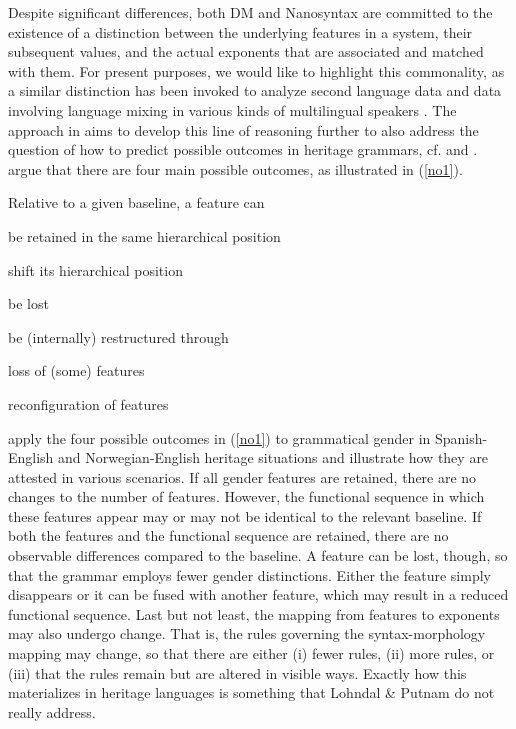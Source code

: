 \documentclass[output=paper,colorlinks,citecolor=brown,footheight=42pt]{langscibook}
\begin{document}
Despite significant differences, both DM and Nanosyntax are committed to the existence of a distinction between the underlying features in a system, their subsequent values, and the actual exponents that are associated and matched with them. For present purposes, we would like to highlight this commonality, as a similar distinction has been invoked to analyze second language data and data involving language mixing in various kinds of multilingual speakers \citep{lardiere1998, lardiere2008, prevost2000,alexiadou2017,alexiadoulohndal2018,riksem2017, riksem2018, lohndaletal2019, putnametal2019, riksemetal2019,putnam2020}. The approach in \citet{lohnput21,lohnput24} aims to develop this line of reasoning further to also address the question of how to predict possible outcomes in heritage grammars, cf. \citet{PolinskyScontras2020} and \citet{putnam2020}. \citet{lohnput21} argue that there are four main possible outcomes, as illustrated in (\ref{no1}).

\begin{exe}
\ex\label{no1} Relative to a given baseline, a feature can
\begin{xlist}
        \item be retained in the same hierarchical position
        \item shift its hierarchical position
        \item be lost
        \item be (internally) restructured through
        \begin{xlist}
        \item loss of (some) features
        \item reconfiguration of features
        \end{xlist}
\end{xlist}
\end{exe}

\citet{lohnput21} apply the four possible outcomes in (\ref{no1}) to grammatical gender in Spanish-English and Norwegian-English heritage situations and illustrate how they are attested in various scenarios. If all gender features are retained, there are no changes to the number of features. However, the functional sequence in which these features appear may or may not be identical to the relevant baseline. If both the features and the functional sequence are retained, there are no observable differences compared to the baseline. A feature can be lost, though, so that the grammar employs fewer gender distinctions. Either the feature simply disappears or it can be fused with another feature, which may result in a reduced functional sequence. Last but not least, the mapping from features to exponents may also undergo change. That is, the rules governing the syntax-morphology mapping may change,  so that there are either (i) fewer rules, (ii) more rules, or (iii) that the rules remain but are altered in visible ways. Exactly how this materializes in heritage languages is something that Lohndal \& Putnam do not really address.
\end{document}
